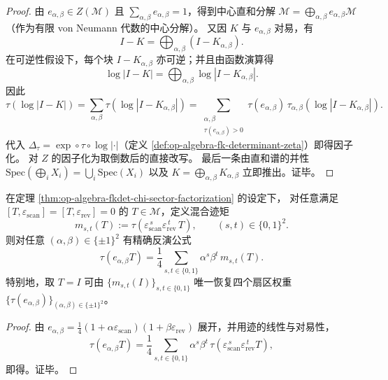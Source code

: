 \begin{proof}
由 \(e_{\alpha,\beta}\in Z(\mathcal M)\) 且 \(\sum_{\alpha,\beta}e_{\alpha,\beta}=1\)，得到中心直和分解
\(
\mathcal M=\bigoplus_{\alpha,\beta} e_{\alpha,\beta}\mathcal M
\)
（作为有限 von Neumann 代数的中心分解）。
又因 \(K\) 与 \(e_{\alpha,\beta}\) 对易，有
\[
I-K=\bigoplus_{\alpha,\beta}\left(I-K_{\alpha,\beta}\right).
\]
在可逆性假设下，每个块 \(I-K_{\alpha,\beta}\) 亦可逆；并且由函数演算得
\[
\log|I-K|
=
\bigoplus_{\alpha,\beta}\log|I-K_{\alpha,\beta}|.
\]
因此
\[
\tau(\log|I-K|)
=
\sum_{\alpha,\beta}\tau\!\left(\log|I-K_{\alpha,\beta}|\right)
=
\sum_{\substack{\alpha,\beta\\ \tau(e_{\alpha,\beta})>0}}\tau(e_{\alpha,\beta})\,\tau_{\alpha,\beta}\!\left(\log|I-K_{\alpha,\beta}|\right).
\]
代入 \(\Delta_\tau=\exp\circ\tau\circ\log|\cdot|\)（定义 \ref{def:op-algebra-fk-determinant-zeta}）即得因子化。
对 \(Z\) 的因子化为取倒数后的直接改写。
最后一条由直和谱的并性 \(\mathrm{Spec}(\bigoplus_i X_i)=\bigcup_i \mathrm{Spec}(X_i)\) 以及 \(K=\bigoplus_{\alpha,\beta}K_{\alpha,\beta}\) 立即推出。证毕。
\end{proof}

\begin{proposition}\label{prop:op-algebra-z2x2-walsh-hadamard-sector-trace}
在定理 \ref{thm:op-algebra-fkdet-chi-sector-factorization} 的设定下，
对任意满足 \([T,\varepsilon_{\mathrm{scan}}]=[T,\varepsilon_{\mathrm{rev}}]=0\) 的 \(T\in\mathcal M\)，定义混合迹矩
\[
m_{s,t}(T):=\tau\!\left(\varepsilon_{\mathrm{scan}}^{\,s}\varepsilon_{\mathrm{rev}}^{\,t}\,T\right),
\qquad (s,t)\in\{0,1\}^2.
\]
则对任意 \((\alpha,\beta)\in\{\pm1\}^2\) 有精确反演公式
\[
\tau(e_{\alpha,\beta}T)=\frac14\sum_{s,t\in\{0,1\}}\alpha^{s}\beta^{t}\,m_{s,t}(T).
\]
特别地，取 \(T=I\) 可由 \(\{m_{s,t}(I)\}_{s,t\in\{0,1\}}\) 唯一恢复四个扇区权重 \(\{\tau(e_{\alpha,\beta})\}_{(\alpha,\beta)\in\{\pm1\}^2}\)。
\end{proposition}
\begin{proof}
由 \(e_{\alpha,\beta}=\frac14(1+\alpha\varepsilon_{\mathrm{scan}})(1+\beta\varepsilon_{\mathrm{rev}})\) 展开，并用迹的线性与对易性，
\[
\tau(e_{\alpha,\beta}T)
=\frac14\sum_{s,t\in\{0,1\}}\alpha^{s}\beta^{t}\,
\tau\!\left(\varepsilon_{\mathrm{scan}}^{\,s}\varepsilon_{\mathrm{rev}}^{\,t}T\right),
\]
即得。证毕。
\end{proof}

\endinput
